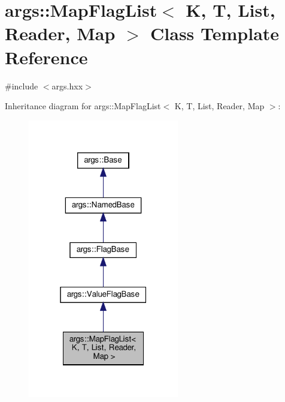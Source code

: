 \hypertarget{classargs_1_1_map_flag_list}{}\section{args\+:\+:Map\+Flag\+List$<$ K, T, List, Reader, Map $>$ Class Template Reference}
\label{classargs_1_1_map_flag_list}


{\ttfamily \#include $<$args.\+hxx$>$}



Inheritance diagram for args\+:\+:Map\+Flag\+List$<$ K, T, List, Reader, Map $>$\+:\nopagebreak
\begin{figure}[H]
\begin{center}
\leavevmode
\includegraphics[width=187pt]{classargs_1_1_map_flag_list__inherit__graph}
\end{center}
\end{figure}


